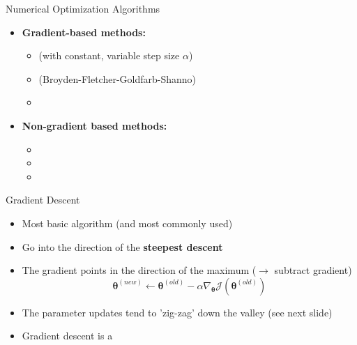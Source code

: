 \begin{frame}{Numerical Optimization Algorithms}{}
	\begin{itemize}
		\item \textbf{Gradient-based methods:}
		\begin{itemize}
			\item {} (with constant, variable step size $\alpha$)
			\item {} (Broyden-Fletcher-Goldfarb-Shanno)
			\item {}
		\end{itemize}
		\item \textbf{Non-gradient based methods:}
		\begin{itemize}
			\item {}
			\item {}
			\item {}
		\end{itemize}
	\end{itemize}
	
	\begin{boxBlueNoFrame}
	\end{boxBlueNoFrame}
\end{frame}


\begin{frame}{Gradient Descent}{}
	\begin{itemize}
		\item Most basic algorithm (and most commonly used)
		\item Go into the direction of the \textbf{steepest descent}
		\item The gradient points in the direction of the maximum ($\rightarrow$ subtract gradient)
		\begin{equation}
			\bm{\theta}^{(new)} \longleftarrow \bm{\theta}^{(old)} -
				\alpha \nabla_{\bm{\theta}} \mathcal{J}(\bm{\theta}^{(old)})
		\end{equation}
		\item The parameter updates tend to 'zig-zag' down the valley (see next slide)
		\item Gradient descent is a 
	\end{itemize}
\end{frame}


